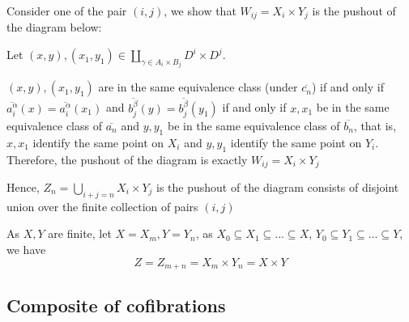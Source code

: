 \documentclass{article}
\begin{document}
\begin{longproof}
    Consider one of the pair $(i, j)$, we show that $W_{ij} = X_i \times Y_j$ is the pushout of the diagram below:
    
        \begin{center}
        \end{center}
    
    
    Let $(x, y), (x_1, y_1) \in \coprod_{\gamma \in A_i \times B_j} D^i \times D^j$.
    
    $(x, y), (x_1, y_1)$ are in the same equivalence class (under $\overline{c_n}$) if and only if $\overline{a_i^\alpha}(x) = \overline{a_i^\alpha}(x_1)$ and $\overline{b_j^\beta}(y) = \overline{b_j^\beta}(y_1)$ if and only if $x, x_1$ be in the same equivalence class of $\overline{a_n}$ and $y, y_1$ be in the same equivalence class of $\overline{b_n}$, that is, $x, x_1$ identify the same point on $X_i$ and $y, y_1$ identify the same point on $Y_i$. Therefore, the pushout of the diagram is exactly $W_{ij} = X_i \times Y_j$

    Hence, $Z_n = \bigcup_{i + j = n} X_i \times Y_j$ is the pushout of the diagram consists of disjoint union over the finite collection of pairs $(i, j)$

    
    As $X, Y$ are finite, let $X = X_m, Y = Y_n$, as $X_0 \subseteq X_1 \subseteq ... \subseteq X$, $Y_0 \subseteq Y_1 \subseteq ... \subseteq Y$, we have
    $$
        Z = Z_{m+n} = X_m \times Y_n = X \times Y
    $$
\end{longproof}

\subsection{Composite of cofibrations}
\end{document}

